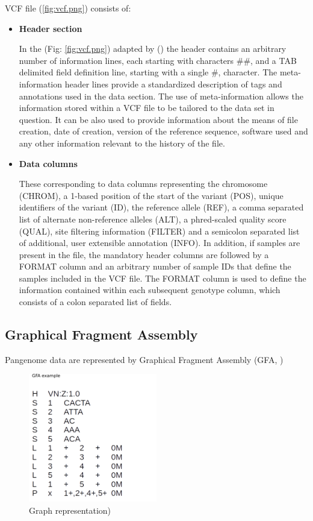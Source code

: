 VCF file (\ref{fig:vcf.png}) consists of:
\begin{itemize}

\item\textbf{Header section}

In the (Fig: \ref{fig:vcf.png}) adapted by (\cite{10.1093/bioinformatics/btr330}) the header contains an arbitrary number of information lines, each starting with characters \#\#, and a TAB delimited field definition line, starting with a single \#,
character. The meta-information header lines provide a standardized description of tags and annotations used in the data section. The use of meta-information allows the information stored within a VCF file to be tailored to the data set in question. It can be also used to provide information about the means of file creation, date of creation, version of the reference sequence, software used and any other information relevant to the history of the file. 

\item\textbf{Data columns}

These corresponding to data columns representing the chromosome (CHROM), a 1-based position of the start of the variant (POS), unique identifiers of the variant (ID), the reference allele (REF), a comma separated list of alternate non-reference alleles (ALT), a phred-scaled quality score (QUAL), site filtering information (FILTER) and a semicolon separated list of additional, user extensible annotation (INFO). In addition, if samples are present in the file, the mandatory header columns are followed by a FORMAT column and an arbitrary number of sample IDs that define the samples included in the VCF file. The FORMAT column is used to define the information contained within each subsequent genotype column, which consists of a colon separated list of fields.

\end{itemize}


\subsection{Graphical Fragment Assembly}

Pangenome data are represented by Graphical Fragment Assembly (GFA, \cite{GFA})

\begin{figure}[H]
\centering
\includegraphics[width=0.50\textwidth]{fig/GFAexample.png}
\decoRule
\caption{Graph representation)} 
\label{fig:GFAexample.png}
\end{figure}

